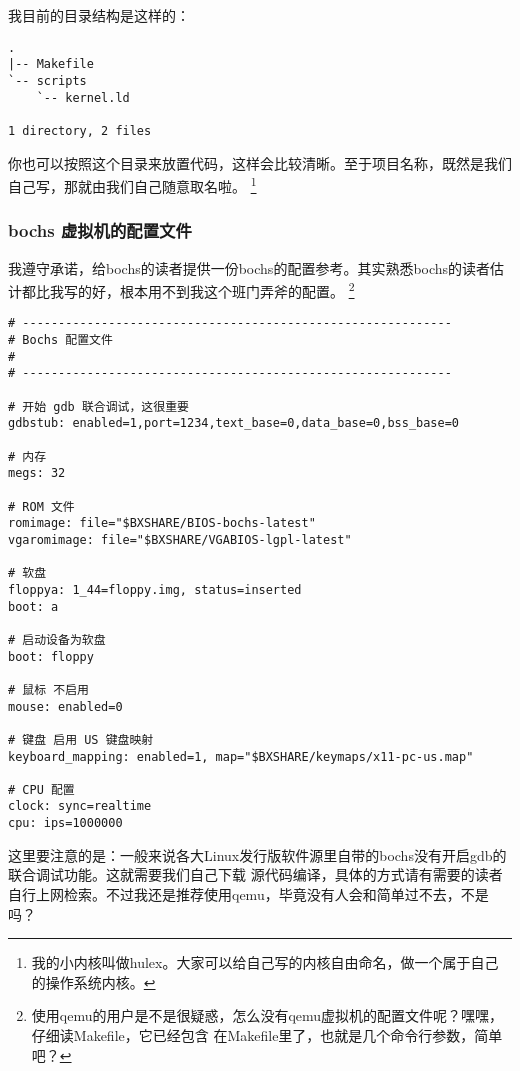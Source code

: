 \par 我目前的目录结构是这样的：
\begin{Verbatim}[frame=single]
.
|-- Makefile
`-- scripts
    `-- kernel.ld

1 directory, 2 files
\end{Verbatim}
\par 你也可以按照这个目录来放置代码，这样会比较清晰。至于项目名称，既然是我们自己写，那就由我们自己随意取名啦。
\footnote{我的小内核叫做hulex。大家可以给自己写的内核自由命名，做一个属于自己的操作系统内核。}

\subsubsection{bochs 虚拟机的配置文件}
\par 我遵守承诺，给bochs的读者提供一份bochs的配置参考。其实熟悉bochs的读者估计都比我写的好，根本用不到我这个班门弄斧的配置。
\footnote{使用qemu的用户是不是很疑惑，怎么没有qemu虚拟机的配置文件呢？嘿嘿，仔细读Makefile，它已经包含\allowbreak
在Makefile里了，也就是几个命令行参数，简单吧？}

\begin{lstlisting}[caption = Bochs 的配置文件]
# ------------------------------------------------------------
# Bochs 配置文件
#
# ------------------------------------------------------------

# 开始 gdb 联合调试，这很重要
gdbstub: enabled=1,port=1234,text_base=0,data_base=0,bss_base=0

# 内存
megs: 32

# ROM 文件
romimage: file="$BXSHARE/BIOS-bochs-latest"
vgaromimage: file="$BXSHARE/VGABIOS-lgpl-latest"

# 软盘
floppya: 1_44=floppy.img, status=inserted
boot: a

# 启动设备为软盘
boot: floppy

# 鼠标 不启用
mouse: enabled=0

# 键盘 启用 US 键盘映射
keyboard_mapping: enabled=1, map="$BXSHARE/keymaps/x11-pc-us.map"

# CPU 配置
clock: sync=realtime
cpu: ips=1000000
\end{lstlisting}

\par 这里要注意的是：一般来说各大Linux发行版软件源里自带的bochs没有开启gdb的联合调试功能。这就需要我们自己下载\allowbreak
源代码编译，具体的方式请有需要的读者自行上网检索。不过我还是推荐使用qemu，毕竟没有人会和简单过不去，不是吗？
